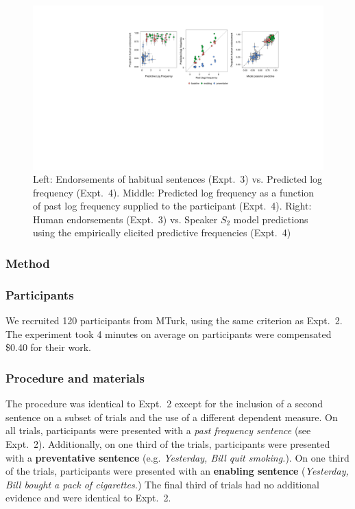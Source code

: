 \documentclass[10pt,letterpaper]{article}
\begin{document}
\begin{figure}[t]
\centering
  \includegraphics[width=\textwidth]{expt3-4-scatters.pdf}
  \caption{Left: Endorsements of habitual sentences (Expt.~3) vs. Predicted log frequency (Expt.~4). Middle: Predicted log frequency as a function of past log frequency supplied to the participant (Expt.~4). Right: Human endorsements (Expt.~3) vs. Speaker $S_2$ model predictions using the empirically elicited predictive frequencies (Expt.~4)}
  \label{fig:tj3}
\end{figure}
\subsubsection{Method}
\subsubsection{Participants} 

We recruited 120 participants from MTurk, using the same criterion as Expt.~2.
The experiment took 4 minutes on average on participants were compensated \$0.40 for their work.

\subsubsection{Procedure and materials}

The procedure was identical to Expt.~2 except for the inclusion of a second sentence on a subset of trials and the use of a different dependent measure. 
On all trials, participants were presented with a \emph{past frequency sentence} (see Expt.~2).
Additionally, on one third of the trials, participants were presented with a \textbf{preventative sentence} (e.g. \emph{Yesterday, Bill quit smoking.}). %
On one third of the trials, participants were presented with an \textbf{enabling sentence} (\emph{Yesterday, Bill bought a pack of cigarettes.}) %
The final third of trials had no additional evidence and were identical to Expt.~2. 
\end{document}
